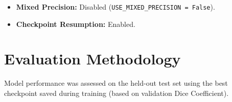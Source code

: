 \begin{itemize}
\begin{itemize}
      \item \texttt{EarlyStopping}: Monitor \texttt{val\_loss}, patience=15, restore best weights.
      \item \texttt{TensorBoard}: Log metrics.
      \item \texttt{ReduceLROnPlateau}: As described above.
      \item \texttt{ConciseProgressCallback}: Summarized updates.
    \end{itemize}
  \item \textbf{Mixed Precision:} Disabled (\texttt{USE\_MIXED\_PRECISION = False}).
  \item \textbf{Checkpoint Resumption:} Enabled.
\end{itemize}

\section{Evaluation Methodology}

Model performance was assessed on the held-out test set using the best checkpoint saved during training (based on validation Dice Coefficient).

